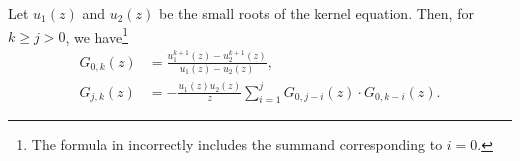 \begin{theorem}\label{thm:gf_positive_basketball_walks}
  Let $u_{1}(z)$ and $u_{2}(z)$ be the small roots of the kernel equation. Then, for $k \geq j > 0$, we have\footnote{The formula in \cite[Proposition 6.3]{Basketball} incorrectly includes the summand corresponding to $i = 0$.}
  \begin{align}
    G_{0,k}(z) &= \frac{u_{1}^{k+1}(z) - u_{2}^{k+1}(z)}{u_{1}(z)-u_{2}(z)},\label{eq:G0k} \\
    G_{j,k}(z) &= -\frac{u_{1}(z)u_{2}(z)}{z}
    \sum_{i=1}^{j}
    G_{0,j-i}(z) \cdot 
    G_{0,k-i}(z). \label{eq:Gjk}
  \end{align}
\end{theorem}

